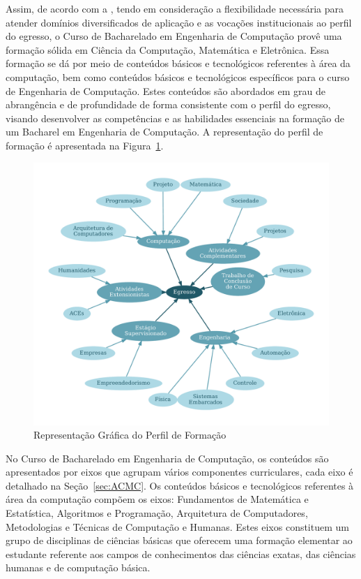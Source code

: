 Assim, de acordo com a , tendo em consideração a flexibilidade necessária para atender domínios diversificados de aplicação e as vocações institucionais ao perfil do egresso, o Curso de Bacharelado em Engenharia de Computação provê uma formação sólida em Ciência da Computação, Matemática e Eletrônica. Essa formação se dá por meio de conteúdos básicos e tecnológicos referentes à área da computação, bem como conteúdos básicos e tecnológicos específicos para o curso de Engenharia de Computação. Estes conteúdos são abordados em grau de abrangência e de profundidade de forma consistente com o perfil do egresso, visando desenvolver as competências e as habilidades essenciais na formação de um Bacharel em Engenharia de Computação. A representação do perfil de formação é apresentada na Figura~\ref{fig:perfil}.


\begin{figure}[H] %
    \centering
    \caption{Representação Gráfica do Perfil de Formação}
    \label{fig:perfil}
    \includegraphics[width=\textwidth]{enc/imagens/Perfil.pdf}
\end{figure}

No Curso de Bacharelado em Engenharia de Computação, os conteúdos são apresentados por eixos que agrupam vários componentes curriculares, cada eixo é detalhado na Seção~\ref{sec:ACMC}. Os conteúdos básicos e tecnológicos referentes à área da computação compõem os eixos: Fundamentos de Matemática e Estatística, Algoritmos e Programação, Arquitetura de Computadores, Metodologias e Técnicas de Computação e Humanas. Estes eixos constituem um grupo de disciplinas de ciências básicas que oferecem uma formação elementar ao estudante referente aos campos de conhecimentos das ciências exatas, das ciências humanas e de computação básica.


